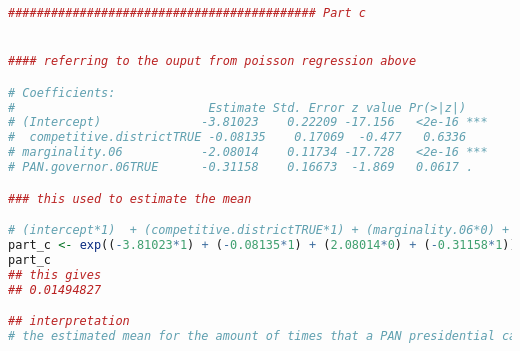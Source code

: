 \documentclass[12pt,letterpaper]{article}
\begin{document}
\begin{enumerate}
\begin{lstlisting}[language=R]
########################################### Part c


#### referring to the ouput from poisson regression above 

# Coefficients:
#                           Estimate Std. Error z value Pr(>|z|)    
# (Intercept)              -3.81023    0.22209 -17.156   <2e-16 ***
#  competitive.districtTRUE -0.08135    0.17069  -0.477   0.6336    
# marginality.06           -2.08014    0.11734 -17.728   <2e-16 ***
# PAN.governor.06TRUE      -0.31158    0.16673  -1.869   0.0617 .

### this used to estimate the mean 

# (intercept*1)  + (competitive.districtTRUE*1) + (marginality.06*0) + (PAN.governor.06TRUE*1) 
part_c <- exp((-3.81023*1) + (-0.08135*1) + (2.08014*0) + (-0.31158*1)) 
part_c
## this gives 
## 0.01494827

## interpretation 
# the estimated mean for the amount of times that a PAN presidential candidate winning in 2006 is 0.01494827





\end{lstlisting}
	
	
	
	
\end{enumerate}
\end{document}
